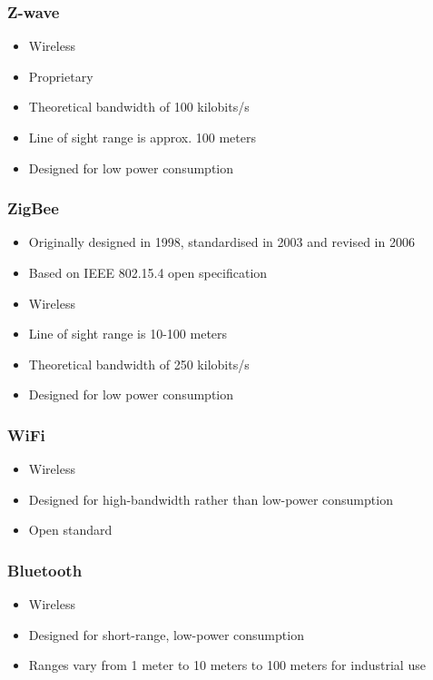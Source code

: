 \subsubsection{Z-wave \cite{wiki_zwave}}

\begin{itemize}
\item Wireless
\item Proprietary
\item Theoretical bandwidth of 100 kilobits/s
\item Line of sight range is approx. 100 meters
\item Designed for low power consumption
\end{itemize}


\subsubsection{ZigBee \cite{wiki_zigbee}}

\begin{itemize}
\item Originally designed in 1998, standardised in 2003 and revised in 2006
\item Based on IEEE 802.15.4 open specification
\item Wireless
\item Line of sight range is 10-100 meters
\item Theoretical bandwidth of 250 kilobits/s
\item Designed for low power consumption
\end{itemize}

\subsubsection{WiFi \cite{wiki_wifi}}

\begin{itemize}
\item Wireless
\item Designed for high-bandwidth rather than low-power consumption
\item Open standard
\end{itemize}


\subsubsection{Bluetooth \cite{wiki_bluetooth}}

\begin{itemize}
\item Wireless
\item Designed for short-range, low-power consumption
\item Ranges vary from 1 meter to 10 meters to 100 meters for industrial use
\end{itemize}

